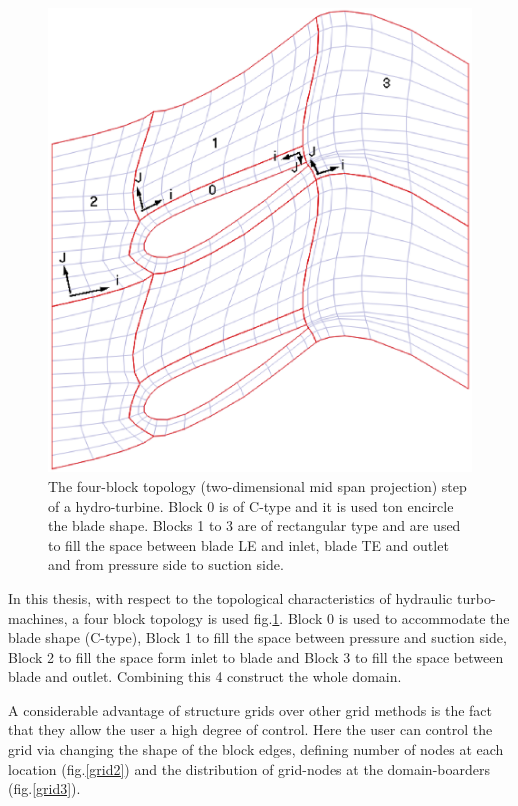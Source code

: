 \begin{figure}[h!]
\centering
\includegraphics[width=120mm]{cGridSkBlockIndex.eps} 
\caption{The four-block topology (two-dimensional mid span projection) step of a hydro-turbine. Block 0 is of C-type and it is used ton encircle the blade shape. Blocks 1 to 3 are of rectangular type and are used to fill the space between blade LE and inlet, blade TE and outlet and from pressure side to suction side. }
\label{grid1}
\end{figure}


In this thesis, with respect to the topological characteristics of hydraulic turbo-machines, a four block topology is used  fig.\ref{grid1}. Block 0 is used to accommodate the blade shape (C-type), Block 1 to fill the space between pressure and suction side, Block 2 to fill the space form inlet to blade and Block 3 to fill the space between blade and outlet. Combining this 4 construct the whole domain. 

A considerable advantage of structure grids over other grid methods is the fact that they allow the user a high degree of control. Here the user can control the grid via changing the shape of the block edges, defining number of nodes at each location (fig.\ref{grid2}) and  the distribution of grid-nodes at the domain-boarders (fig.\ref{grid3}).                      



